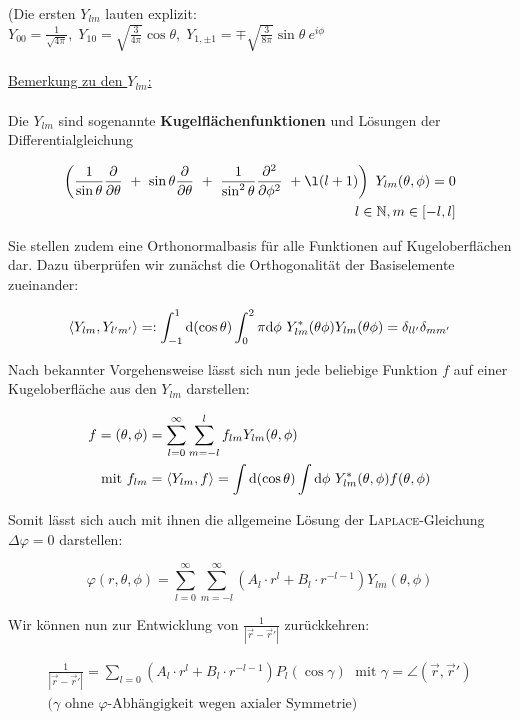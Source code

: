 (Die ersten $Y_{lm}$ lauten explizit: $Y_{00} = \frac{1}{\sqrt{4\pi}}, \; Y_{10} = \sqrt{\frac{3}{4\pi}}\cos\theta, \; Y_{1,\pm1} = \mp \sqrt{\frac{3}{8\pi}}\sin\theta \ e^{i\phi}$\
\\
\ \\
\underline{Bemerkung zu den $Y_{lm}$:}\
\\
\ \\
Die $Y_{lm}$ sind sogenannte \textbf{Kugelflächenfunktionen} und Lösungen der Differentialgleichung

\begin{align*}
\left(\frac{1}{\sin\theta}\pdiff{}{\theta} \ + \ \sin\theta \pdiff{}{\theta} \ + \ \frac{1}{\sin^2\theta} \pddiff{}{\phi} \ + \l(l+1)\right) \ Y_{lm}(\theta,\phi) = 0\\
l \in \mathbb{N}, m \in [-l,l]
\end{align*}

Sie stellen zudem eine Orthonormalbasis für alle Funktionen auf Kugeloberflächen dar. Dazu überprüfen wir zunächst die Orthogonalität der Basiselemente zueinander:

\begin{equation*}
\langle Y_{lm},Y_{l'm'}\rangle =: \int_{-1}^1\mathrm{d}(\cos\theta)\int_{0}^2\pi\mathrm{d}\phi \ Y^{*}_{lm}(\theta\phi) Y_{lm}(\theta\phi) = \delta_{ll'}\delta_{mm'}
\end{equation*}

Nach bekannter Vorgehensweise lässt sich nun jede beliebige Funktion $f$ auf einer Kugeloberfläche aus den $Y_{lm}$ darstellen:

\begin{align*}
f = (\theta,\phi) &= \sum_{l=0}^{\infty} \sum_{m=-l}^{l} f_{lm} Y_{lm}(\theta,\phi)\\
\text{mit } f_{lm} &= \langle Y_{lm},f\rangle = \int\mathrm{d}(\cos\theta) \int\mathrm{d}\phi \ Y^{*}_{lm}(\theta,\phi)f(\theta,\phi)
\end{align*}

Somit lässt sich auch mit ihnen die allgemeine Lösung der \textsc{Laplace}-Gleichung $\Delta\varphi=0$ darstellen: 

\begin{equation*}
\varphi(r,\theta,\phi) = \sum_{l=0}^{\infty}\sum_{m=-l}^{\infty} \left(A_l \cdot r^l + B_l \cdot r^{-l-1}\right) Y_{lm}(\theta,\phi)
\end{equation*}

Wir können nun zur Entwicklung von $\frac{1}{|\vec{r} - \vec{r}'|}$ zurückkehren:

\begin{align*}
\frac{1}{|\vec{r} - \vec{r}'|} = \sum_{l=0} \left(A_l \cdot r^l + B_l \cdot r^{-l-1}\right) P_l(\cos\gamma) \; \text{ mit } \gamma = \angle\left(\vec{r},\vec{r}'\right)\\
(\gamma\text{ ohne $\varphi$-Abhängigkeit wegen axialer Symmetrie)}
\end{align*}

